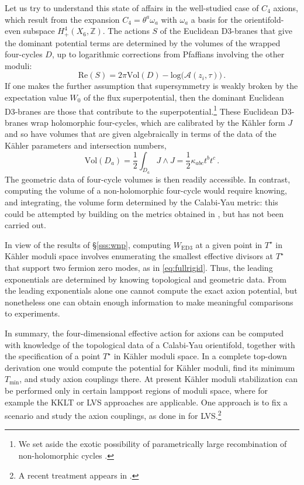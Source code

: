 \documentclass[12pt,a4wide]{article}
\begin{document}
Let us try to understand this state of affairs in the well-studied case of $C_4$ axions, which result from the expansion $C_4 = \theta^a \omega_a$ with $\omega_a$ a basis for the orientifold-even subspace $H^{4}_{+}(X_6,\mathbb{Z})$.
The actions $S$ of the Euclidean D3-branes that give the dominant potential terms are determined by the volumes of the wrapped four-cycles $D$, up to logarithmic corrections from Pfaffians involving the other moduli:
\begin{equation}
\text{Re}(S) = 2\pi \text{Vol}(D) - \text{log}\bigl(\mathcal{A}(z_i,\tau)\bigr)\,.
\end{equation}
If one makes the further assumption that supersymmetry is weakly broken by the expectation value $W_0$ of the flux superpotential, then the dominant Euclidean D3-branes are those that contribute to the superpotential.\footnote{We set aside the exotic possibility of parametrically large recombination of non-holomorphic cycles \cite{Demirtas:2019lfi}.}  These Euclidean D3-branes wrap holomorphic four-cycles, which are calibrated by the K\"ahler form $J$ and so have volumes that are given algebraically in terms of the data of the K\"ahler parameters and intersection numbers, 
\begin{equation}
\text{Vol}(D_a) = \frac{1}{2} \int_{D_a} J \wedge J = \frac{1}{2}\kappa_{abc}t^b t^c\,.
\end{equation}
The geometric data of four-cycle volumes is then readily accessible. In contrast, computing the volume of a non-holomorphic four-cycle would require knowing, and integrating, the volume form determined by the Calabi-Yau metric: this could be attempted by building on the metrics obtained in  \cite{Ashmore:2019wzb,Cui:2019uhy,Anderson:2020hux,Douglas:2020hpv,Larfors:2022nep,Berglund:2022gvm,Gerdes:2022nzr,Ashmore:2023ajy}, but has not been carried out.
 
 

In view of the results of \S\ref{sss:wnp}, computing $W_{\text{ED3}}$ at a given point in $T^{\star}$ in K\"ahler moduli space involves enumerating the smallest effective divisors at $T^{\star}$ that support two fermion zero modes, as in \eqref{eq:fullrigid}.
Thus, the leading exponentials are determined by knowing topological and geometric data.  From the leading exponentials alone one cannot compute the exact axion potential, but nonetheless one can obtain enough information to make meaningful comparisons to experiments.

In summary, the four-dimensional effective action for axions can be computed with knowledge of the topological data of a Calabi-Yau orientifold, together with the specification of a point $T^{\star}$ in K\"ahler moduli space.
In a complete top-down derivation one would compute the potential for K\"ahler moduli, find its minimum $T_{\text{min}}$, and study axion couplings there.  At present K\"ahler moduli stabilization can be performed only in certain lamppost regions of moduli space, where for example the KKLT or LVS approaches are applicable.  One approach is to fix a scenario and study the axion couplings, as done in \cite{Cicoli:2012sz} for LVS.\footnote{A recent treatment appears in \cite{Broeckel:2021dpz}.}  
\end{document}
